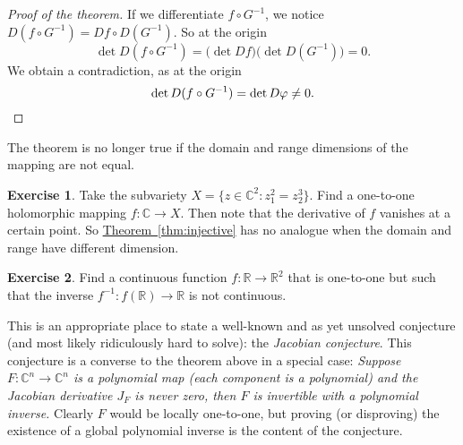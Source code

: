 \documentclass[12pt,openany]{book}
\newcommand{\C}{{\mathbb{C}}}
\newcommand{\R}{{\mathbb{R}}}
\newcommand{\myindex}[1]{#1\index{#1}}
\theoremstyle{plain}
\theoremstyle{remark}
\theoremstyle{definition}
\newenvironment{exbox}{%
    \def\FrameCommand{\vrule width 1pt \relax\hspace{10pt}}%
    \MakeFramed{\advance\hsize-\width\FrameRestore}%
}{%
    \endMakeFramed
}
\theoremstyle{exercise}
\newtheorem{exercise}{Exercise}[section]
\theoremstyle{example}
\newcommand{\thmref}[1]{\hyperref[#1]{Theorem~\ref*{#1}}}
\begin{document}
\begin{proof}[Proof of the theorem]
If we differentiate $f \circ G^{-1}$, we notice 
$D(f \circ G^{-1}) = Df \circ D(G^{-1})$.
So at the origin
\begin{equation*}
\det D(f \circ G^{-1}) = \bigl(\det Df\bigr) \bigl(\det D(G^{-1})\bigr) = 0.
\end{equation*}
We obtain a contradiction, as at the origin
\begin{equation*}
\det 
D(f \circ G^{-1})
= \det D\varphi \not= 0 . \qedhere
\end{equation*}
\end{proof}

The theorem is no longer true if the domain and range dimensions of the
mapping are not equal.

\begin{exbox}
\begin{exercise}
Take the subvariety
$X = \bigl\{ z \in \C^2 : z_1^2 = z_2^3 \bigr\}$.
Find a one-to-one holomorphic mapping $f \colon \C \to X$.
Then note that the derivative of $f$ vanishes at a certain point.
So \thmref{thm:injective} has no analogue when the domain and range have
different dimension.
\end{exercise}

\begin{exercise}
Find a continuous function $f \colon \R \to \R^2$ that is one-to-one but
such that the inverse $f^{-1} \colon f(\R) \to \R$ is not continuous.
\end{exercise}
\end{exbox}

\pagebreak[1]
This is an appropriate place to state a well-known and as yet unsolved conjecture (and most
likely ridiculously hard to solve):
the \emph{\myindex{Jacobian conjecture}}.
This conjecture is a converse to the 
theorem above in a special case:
\emph{Suppose $F \colon \C^n \to \C^n$ is a polynomial map (each component is a
polynomial) and the Jacobian derivative $J_F$ is never zero, then $F$ is
invertible with a polynomial inverse.}
Clearly $F$ would be locally one-to-one, but proving (or
disproving)
the existence of a global polynomial inverse is the content of the conjecture.
\end{document}
